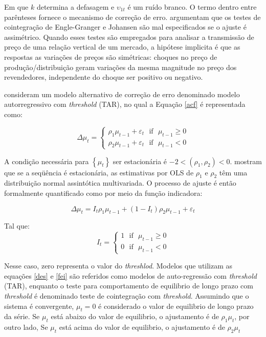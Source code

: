 \documentclass[
	article,			%
	12pt,				%
	openright,			%
	oneside,			%
	a4paper,			%
	english,			%
	brazil				%
	]{abntex2}
\begin{document}
Em que $k$ determina a defasagem e $\upsilon_{1t}$ é um ruído branco. O termo dentro entre parênteses fornece o mecanismo de correção de erro.  argumentam que os testes de cointegração de Engle-Granger e Johansen são mal especificados se o ajuste é assimétrico. Quando esses testes são empregados para analisar a transmissão de preço de uma relação vertical de um mercado, a hipótese implicita é que as respostas as variações de preços são simétricas: choques no preço de produção/distribuição geram variações da mesma magnitude no preço dos revendedores, independente do choque ser positivo ou negativo.

 consideram um modelo alternativo de correção de erro denominado modelo autorregressivo com \textit{threshold} (TAR), no qual a Equação \ref{acf} é representada como:

\begin{equation} \label{dess}
\Delta \mu_{t}=\left\{\begin{matrix}
\rho_{1}\mu_{t-1}+\varepsilon_{t} \ \ \ \text{if} \ \ \ \mu_{t-1}\geq 0 \\ 
\rho_{2}\mu_{t-1}+\varepsilon_{t} \ \ \ \text{if} \ \ \ \mu_{t-1}<  0
\end{matrix}\right.
\end{equation}

A condição necessária para $\left \{ \mu_{t} \right \}$ ser estacionária é $-2<(\rho_{1},\rho_{2})<0$.  mostram que se a seqüência é estacionária, as estimativas por OLS de $\rho_ {1}$ e $\rho_ {2}$ têm uma distribuição normal assintótica multivariada. O processo de ajuste é então formalmente quantificado como por meio da função indicadora:

\begin{equation} \label{des}
\Delta \mu_{t}=I_{t}\rho_{1}\mu_{t-1} +\left ( 1-I_{t} \right )\rho_{2}\mu_{t-1}+\varepsilon_{t}
\end{equation}

Tal que:
\begin{equation} \label{fei}
I_{t}=\left\{\begin{matrix}
1 \ \ \ \text{if} \ \ \ \mu_{t-1}\geq 0 \\ 
0 \ \ \ \text{if} \ \ \ \mu_{t-1}<  0
\end{matrix}\right.
\end{equation}


Nesse caso, zero representa o valor do \textit{threshlod}. Modelos que utilizam as equações \ref{des} e \ref{fei} são referidos como modelos de auto-regressão com \textit{threshold} (TAR), enquanto o teste para comportamento de equilibrio de longo prazo com \textit{threshold} é denominado teste de cointegração com \textit{threshold}. Assumindo que o sistema é convergente, $\mu_{t}=0$ é considerado o valor de equilibrio de longo prazo da série. Se $\mu_{t}$ está abaixo do valor de equilibrio, o ajustamento é de $\rho_{1}\mu_{t}$, por outro lado, Se $\mu_{t}$ está acima do valor de equilibrio, o ajustamento é de $\rho_{2}\mu_{t}$ 
\end{document}
